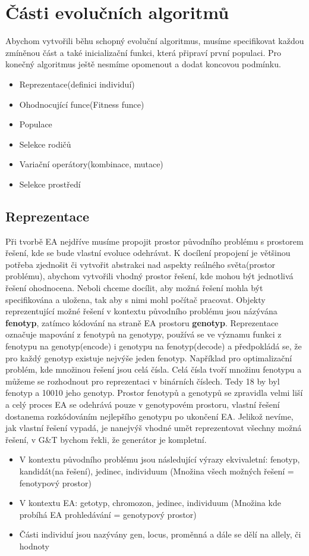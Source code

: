 \section{Části evolučních algoritmů}
Abychom vytvořili běhu schopný evoluční algoritmus, musíme specifikovat každou zmíněnou část a také inicializační funkci, která připraví první populaci. Pro konečný algoritmus ještě nesmíme opomenout a dodat koncovou podmínku. 
\begin{itemize}
\item{Reprezentace(definici individuí)}
\item{Ohodnocující funce(Fitness funce)}
\item{Populace}
\item{Selekce rodičů}
\item{Variační operátory(kombinace, mutace)}
\item{Selekce prostředí}
\end{itemize}
\subsection{Reprezentace}
Při tvorbě EA nejdříve musíme propojit prostor původního problému s prostorem řešení, kde se bude vlastní evoluce odehrávat. K docílení propojení je většinou potřeba zjednošit či vytvořit abstrakci nad aspekty reálného světa(prostor problému), abychom vytvořili vhodný prostor řešení, kde mohou být jednotlivá řešení ohodnocena. Neboli chceme docílit, aby možná řešení mohla být specifikována a uložena, tak aby s nimi mohl počítač pracovat. Objekty reprezentující možné řešení v kontextu původního problému jsou názývána \textbf{fenotyp}, zatímco kódování na straně EA prostoru \textbf{genotyp}. Reprezentace označuje mapování z fenotypů na genotypy, používá se ve významu funkci z fenotypu na genotyp(encode) i genotypu na fenotyp(decode) a předpokládá se, že pro každý genotyp existuje nejvýše jeden fenotyp. Například pro optimalizační problém, kde množinou řešení jsou celá čísla. Celá čísla tvoří množinu fenotypu a můžeme se rozhodnout pro reprezentaci v binárních číslech. Tedy 18 by byl fenotyp a 10010 jeho genotyp. Prostor fenotypů a genotypů se zpravidla velmi liší a celý proces EA se odehrává pouze v genotypovém prostoru, vlastní řešení dostanema rozkódováním nejlepšího genotypu po ukončení EA. Jelikož nevíme, jak vlastní řešení vypadá, je nanejvýš vhodné umět reprezentovat všechny možná řešení, v G\&T bychom řekli, že generátor je kompletní.
\begin{itemize}   
  \item V kontextu původního problému jsou následující výrazy ekvivaletní: fenotyp, kandidát(na řešení), jedinec, individuum (Množina všech možných řešení = fenotypový prostor)
  \item V kontextu EA: getotyp, chromozon, jedinec, individuum (Množina kde probíhá EA prohledávání = genotypový prostor)
  \item Části individuí jsou nazývány gen, locus, proměnná a dále se dělí na allely, či hodnoty
  \end{itemize}
